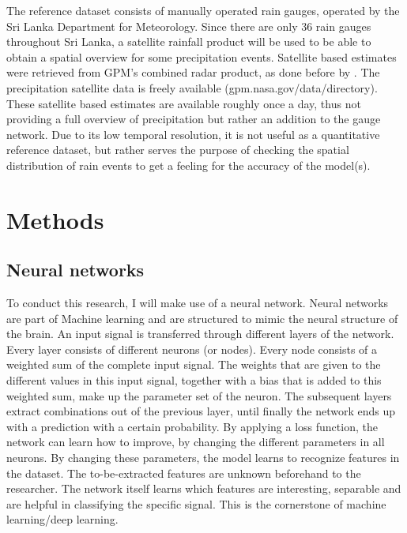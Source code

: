 \documentclass[twocolumn, 10pt, a4paper]{article}
\begin{document}
	The reference dataset consists of manually operated rain gauges, operated by the Sri Lanka Department for Meteorology. Since there are only 36 rain gauges throughout Sri Lanka, a satellite rainfall product will be used to be able to obtain a spatial overview for some precipitation events. Satellite based estimates were retrieved from GPM's combined radar product, as done before by . The precipitation satellite data is freely available (gpm.nasa.gov/data/directory). These satellite based estimates are available roughly once a day, thus not providing a full overview of precipitation but rather an addition to the gauge network. Due to its low temporal resolution, it is not useful as a quantitative reference dataset, but rather serves the purpose of checking the spatial distribution of rain events to get a feeling for the accuracy of the model(s).
	
	\section{Methods}
	\subsection{Neural networks}
	To conduct this research, I will make use of a neural network. Neural networks are part of Machine learning and are structured to mimic the neural structure of the brain. An input signal is transferred through different layers of the network. Every layer consists of different neurons (or nodes). Every node consists of a weighted sum of the complete input signal. The weights that are given to the different values in this input signal, together with a bias that is added to this weighted sum, make up the parameter set of the neuron. 
	The subsequent layers extract combinations out of the previous layer, until finally the network ends up with a prediction with a certain probability. By applying a loss function, the network can learn how to improve, by changing the different parameters in all neurons. By changing these parameters, the model learns to recognize features in the dataset. The to-be-extracted features are unknown beforehand to the researcher. The network itself learns which features are interesting, separable and are helpful in classifying the specific signal. This is the cornerstone of machine learning/deep learning. 
	
\end{document}

